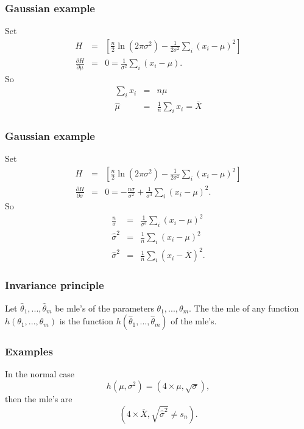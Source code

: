 \begin{frame}[fragile]\frametitle{Gaussian example}
{\tiny

Set
\begin{eqnarray*}
H &=& \left[ \frac{n}{2} \ln(2 \pi \sigma^2) - \frac{1}{2 \sigma^2}
  \sum_i (x_i - \mu )^2\right] \\ 
\frac{\partial H}{\partial \mu} &=& 0 =  \frac{1}{\sigma^2} \sum_i(x_i-\mu). 
\end{eqnarray*}
So
\begin{eqnarray*}
\sum_i x_i  & = & n \mu \\ 
\hat{\mu} &= & \frac{1}{n} \sum_i x_i = \bar{X}
\end{eqnarray*}

}
\end{frame}


\begin{frame}[fragile]\frametitle{Gaussian example}
{\tiny

Set
\begin{eqnarray*}
H &=& \left[ \frac{n}{2} \ln(2 \pi \sigma^2) - \frac{1}{2 \sigma^2}
  \sum_i (x_i - \mu )^2\right] \\ 
\frac{\partial H}{\partial \sigma} &=& 0 =  -\frac{n \sigma}{\sigma^2}
+ \frac{1}{\sigma^3} \sum_i(x_i-\mu)^2. 
\end{eqnarray*}
So
\begin{eqnarray*}
\frac{n}{\sigma} & = & \frac{1}{\sigma^3} \sum_i(x_i-\mu)^2 \\ 
\hat{\sigma}^2 &= & \frac{1}{n} \sum_i(x_i-\mu)^2 \\ 
\hat{\sigma}^2 &= & \frac{1}{n} \sum_i(x_i-\bar{X})^2.
\end{eqnarray*}

}
\end{frame}


\begin{frame}[fragile]\frametitle{Invariance principle}


\begin{prop}

Let $\hat{\theta}_1,...,\hat{\theta}_m$ be mle's of the
parameters $\theta_1,...,\theta_m$. The the mle of
any function $h(\theta_1,...,\theta_m)$ is the function
$h(\hat{\theta}_1,...,\hat{\theta}_m)$ of the mle's.

\end{prop}
\end{frame}


\begin{frame}[fragile]\frametitle{Examples}

In the normal case 
$$h(\mu,\sigma^2) = (4 \times \mu, \sqrt{\sigma}),$$ 
then the mle's are
$$(4 \times \bar{X}, \sqrt{\hat{\sigma}^2} \neq s_n).$$

\end{frame}



